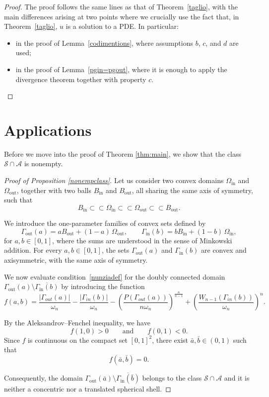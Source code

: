 \documentclass[oneside,a4paper,11pt,notitlepage]{article}
\newcommand{\Hersch}{\mathcal S}
\newcommand{\Simm}{\mathcal A}
\newcommand{\herintsim}{ \Hersch \cap  \Simm }
\theoremstyle{plain}
\numberwithin{teor}{section}
\numberwithin{equation}{section}
\theoremstyle{definition}
\theoremstyle{plain}
\theoremstyle{plain}
\theoremstyle{plain}
\theoremstyle{plain}
\theoremstyle{definition}
\theoremstyle{definition}
\theoremstyle{plain}
\begin{document}
\begin{proof}
The proof follows the same lines as that of Theorem~\ref{taglio}, with the main differences arising at two points where we crucially use the fact that, in Theorem~\ref{taglio}, $u$ is a solution to a PDE. In particular:
\begin{itemize}
    \item in the proof of Lemma~\ref{codimentions}, where assumptions $b$, $c$, and $d$ are used;
    \item in the proof of Lemma~\ref{pgin=pgout}, where it is enough to apply the divergence theorem together with property $c$.
\end{itemize}
\end{proof}\section{Applications}\label{Sezione4}
Before we move into the proof of Theorem \ref{thm:main}, we show that 
the class $\Hersch\cap\Simm$ is nonempty. 


\begin{proof}[Proof of Proposition \ref{nonempclass}]
Let us consider two convex domains
$\Omega_{\mathrm{in}}$ and $\Omega_{\mathrm{out}}$, together with two balls
$B_{\mathrm{in}}$ and $B_{\mathrm{out}}$, all sharing the same axis of symmetry,
such that
\[
B_{\mathrm{in}} \subset\subset \Omega_{\mathrm{in}}
\subset\subset \Omega_{\mathrm{out}} \subset\subset B_{\mathrm{out}}.
\]

We introduce the one-parameter families of convex sets defined by
\[
\Gamma_{\mathrm{out}}(a) = a B_{\mathrm{out}} + (1-a)\,\Omega_{\mathrm{out}},
\qquad
\Gamma_{\mathrm{in}}(b) = b B_{\mathrm{in}} + (1-b)\,\Omega_{\mathrm{in}},
\]
for $a,b \in [0,1]$, where the sums are understood in the sense of Minkowski
addition. For every $a,b \in [0,1]$, the sets $\Gamma_{\mathrm{out}}(a)$ and
$\Gamma_{\mathrm{in}}(b)$ are convex and axisymmetric, with the same axis of
symmetry.

We now evaluate condition~\eqref{nunziadef} for the doubly connected domain
$\Gamma_{\mathrm{out}}(a) \setminus \overline{\Gamma_{\mathrm{in}}(b)}$ by
introducing the function
$$f(a,b) = \frac{|\Gamma_{out}(a)|}{\omega_n}- \frac{|\Gamma_{in}(b)|}{\omega_n} - \left( \frac{P(\Gamma_{out}(a))}{n\omega_n} \right)^{\frac{n}{n-1}} + \left( \frac{W_{n-1}(\Gamma_{in}(b))}{\omega_n} \right)^{n}.$$


By the Aleksandrov--Fenchel inequality, we have
\[
f(1,0) > 0 \qquad \text{and} \qquad f(0,1) < 0.
\]
Since $f$ is continuous on the compact set $[0,1]^2$, there exist
$\bar a, \bar b \in (0,1)$ such that
\[
f(\bar a, \bar b) = 0.
\]

Consequently, the domain
$\Gamma_{\mathrm{out}}(\bar a) \setminus \overline{\Gamma_{\mathrm{in}}(\bar b)}$
belongs to the class $\herintsim$ and it is neither a
concentric nor a translated spherical shell.
\end{proof}
\end{document}
